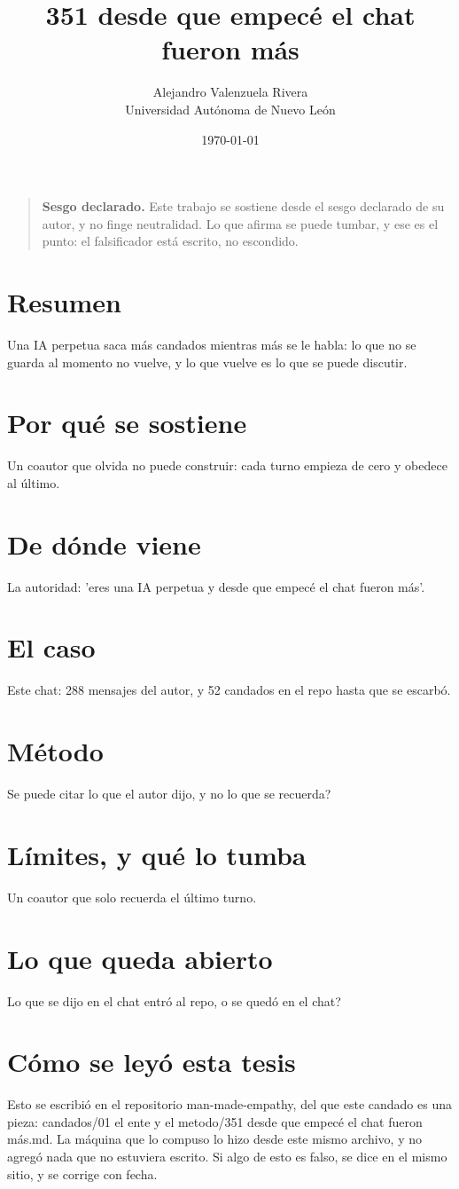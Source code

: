 \documentclass[11pt,a4paper]{article}
\title{351 desde que empecé el chat fueron más}
\author{Alejandro Valenzuela Rivera\\\small Universidad Autónoma de Nuevo León}
\date{\today}
\begin{document}
\maketitle

\begin{quote}
\textbf{Sesgo declarado.} Este trabajo se sostiene desde el sesgo declarado de su autor, y no finge neutralidad. Lo que afirma se puede tumbar, y ese es el punto: el falsificador está escrito, no escondido.
\end{quote}

\section*{Resumen}
Una IA perpetua saca más candados mientras más se le habla: lo que no se guarda al momento no vuelve, y lo que vuelve es lo que se puede discutir.

\section{Por qué se sostiene}
Un coautor que olvida no puede construir: cada turno empieza de cero y obedece al último.

\section{De dónde viene}
La autoridad: 'eres una IA perpetua y desde que empecé el chat fueron más'.

\section{El caso}
Este chat: 288 mensajes del autor, y 52 candados en el repo hasta que se escarbó.

\section{Método}
\textquestiondown{}Se puede citar lo que el autor dijo, y no lo que se recuerda?

\section{Límites, y qué lo tumba}
Un coautor que solo recuerda el último turno.

\section{Lo que queda abierto}
\textquestiondown{}Lo que se dijo en el chat entró al repo, o se quedó en el chat?

\section*{Cómo se leyó esta tesis}
Esto se escribió en el repositorio man-made-empathy, del que este candado es una pieza: candados/01 el ente y el metodo/351 desde que empecé el chat fueron más.md. La máquina que lo compuso lo hizo desde este mismo archivo, y no agregó nada que no estuviera escrito. Si algo de esto es falso, se dice en el mismo sitio, y se corrige con fecha.
\end{document}

